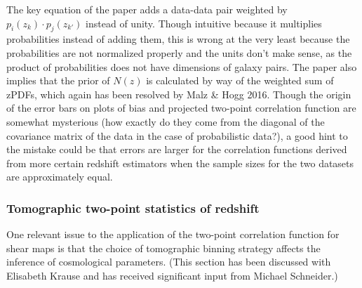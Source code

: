 \documentclass[12pt, onecolumn]{emulateapj}
\begin{document}
The key equation of the paper adds a data-data pair weighted by $p_{i}(z_{k})\cdot p_{j}(z_{k'})$ instead of unity.  Though intuitive because it multiplies probabilities instead of adding them, this is wrong at the very least because the probabilities are not normalized properly and the units don't make sense, as the product of probabilities does not have dimensions of galaxy pairs.  The paper also implies that the prior of $N(z)$ is calculated by way of the weighted sum of zPDFs, which again has been resolved by Malz \& Hogg 2016.  Though the origin of the error bars on plots of bias and projected two-point correlation function are somewhat mysterious (how exactly do they come from the diagonal of the covariance matrix of the data in the case of probabilistic data?), a good hint to the mistake could be that errors are larger for the correlation functions derived from more certain redshift estimators when the sample sizes for the two datasets are approximately equal.

\subsubsection{Tomographic two-point statistics of redshift}

One relevant issue to the application of the two-point correlation function for shear maps is that the choice of tomographic binning strategy affects the inference of cosmological parameters.  (This section has been discussed with Elisabeth Krause and has received significant input from Michael Schneider.)
\end{document}
